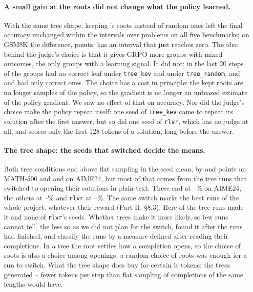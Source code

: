 \paragraph{A small gain at the roots did not change what the policy learned.} With the same tree shape, keeping
\kev{}'s roots instead of random ones left the final accuracy unchanged within the intervals over problems on all
five benchmarks; on GSM8K the difference, 
 points, has an interval that just reaches zero. The
idea behind the judge's choice is that it gives GRPO more groups with mixed outcomes, the only groups with a
learning signal. It did not: in the last 20 steps  of the groups had no correct leaf under
\texttt{tree\_kev} and  under \texttt{tree\_random}, and  and
 had only correct ones. The choice has a cost in principle: the kept roots are no longer samples
of the policy, so the gradient is no longer an unbiased estimate of the policy gradient. We saw no effect of that on
accuracy. Nor did the judge's choice make the policy repeat itself: one seed of \texttt{tree\_kev} came to repeat its
solution after the first answer, but so did one seed of \texttt{rlvr}, which has no judge at all, and \kev{} scores only
the first 128 tokens of a solution, long before the answer.

\paragraph{The tree shape: the seeds that switched decide the means.} Both tree conditions end above flat sampling in
the seed mean, by  and  points on MATH-500 and  and
 on AIME24, but most of that comes from the  tree runs that switched to
opening their solutions in plain text. These end at --\% on AIME24,
the others at --\% and \texttt{rlvr} at
--\%. The same switch marks the best runs of the whole project, whatever their
reward (Part II, \S8.3). Here  of the tree runs made it and none of \texttt{rlvr}'s
 seeds. Whether trees make it more likely, so few runs cannot tell, the less so as we did not plan for
the switch, found it after the runs had finished, and classify the runs by a measure defined after reading their
completions. In a tree the root settles how a completion opens, so the choice of roots is also a choice among
openings; a random choice of roots was enough for a run to switch. What the tree shape does buy for certain is tokens:
the trees generated -- fewer tokens per step than flat sampling of completions
of the same lengths would have.

